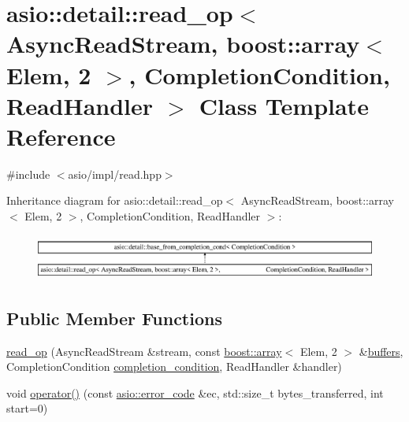 \hypertarget{classasio_1_1detail_1_1read__op_3_01_async_read_stream_00_01boost_1_1array_3_01_elem_00_012_01_4b92266d3d5081f809423aa72530eb694}{}\section{asio\+:\+:detail\+:\+:read\+\_\+op$<$ Async\+Read\+Stream, boost\+:\+:array$<$ Elem, 2 $>$, Completion\+Condition, Read\+Handler $>$ Class Template Reference}
\label{classasio_1_1detail_1_1read__op_3_01_async_read_stream_00_01boost_1_1array_3_01_elem_00_012_01_4b92266d3d5081f809423aa72530eb694}


{\ttfamily \#include $<$asio/impl/read.\+hpp$>$}

Inheritance diagram for asio\+:\+:detail\+:\+:read\+\_\+op$<$ Async\+Read\+Stream, boost\+:\+:array$<$ Elem, 2 $>$, Completion\+Condition, Read\+Handler $>$\+:\begin{figure}[H]
\begin{center}
\leavevmode
\includegraphics[height=1.513514cm]{classasio_1_1detail_1_1read__op_3_01_async_read_stream_00_01boost_1_1array_3_01_elem_00_012_01_4b92266d3d5081f809423aa72530eb694}
\end{center}
\end{figure}
\subsection*{Public Member Functions}
\begin{DoxyCompactItemize}
\item 
\hyperlink{classasio_1_1detail_1_1read__op_3_01_async_read_stream_00_01boost_1_1array_3_01_elem_00_012_01_4b92266d3d5081f809423aa72530eb694_a4b1a4a4387588c4b23710036fa320dbe}{read\+\_\+op} (Async\+Read\+Stream \&stream, const \hyperlink{classboost_1_1array}{boost\+::array}$<$ Elem, 2 $>$ \&\hyperlink{group__async__read_ga54dede45c3175148a77fe6635222c47d}{buffers}, Completion\+Condition \hyperlink{group__async__read_gae2e215d5013596cc2b385bb6c13fa518}{completion\+\_\+condition}, Read\+Handler \&handler)
\item 
void \hyperlink{classasio_1_1detail_1_1read__op_3_01_async_read_stream_00_01boost_1_1array_3_01_elem_00_012_01_4b92266d3d5081f809423aa72530eb694_a301a210d40e99df53bac268ffcef5a2a}{operator()} (const \hyperlink{classasio_1_1error__code}{asio\+::error\+\_\+code} \&ec, std\+::size\+\_\+t bytes\+\_\+transferred, int start=0)
\end{DoxyCompactItemize}
